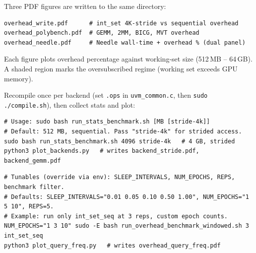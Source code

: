Three PDF figures are written to the same directory:

\begin{lstlisting}
overhead_write.pdf      # int_set 4K-stride vs sequential overhead
overhead_polybench.pdf  # GEMM, 2MM, BICG, MVT overhead
overhead_needle.pdf     # Needle wall-time + overhead % (dual panel)
\end{lstlisting}

Each figure plots overhead percentage against working-set size (512\,MB --
64\,GB).  A shaded region marks the oversubscribed regime (working set exceeds
GPU memory).


Recompile once per backend (set \texttt{.ops} in \texttt{uvm\_common.c}, then
\texttt{sudo ./compile.sh}), then collect stats and plot:

\begin{lstlisting}
# Usage: sudo bash run_stats_benchmark.sh [MB [stride-4k]]
# Default: 512 MB, sequential. Pass "stride-4k" for strided access.
sudo bash run_stats_benchmark.sh 4096 stride-4k   # 4 GB, strided
python3 plot_backends.py   # writes backend_stride.pdf, backend_gemm.pdf
\end{lstlisting}


\begin{lstlisting}
# Tunables (override via env): SLEEP_INTERVALS, NUM_EPOCHS, REPS, benchmark filter.
# Defaults: SLEEP_INTERVALS="0.01 0.05 0.10 0.50 1.00", NUM_EPOCHS="1 5 10", REPS=5.
# Example: run only int_set_seq at 3 reps, custom epoch counts.
NUM_EPOCHS="1 3 10" sudo -E bash run_overhead_benchmark_windowed.sh 3 int_set_seq
python3 plot_query_freq.py   # writes overhead_query_freq.pdf
\end{lstlisting}

